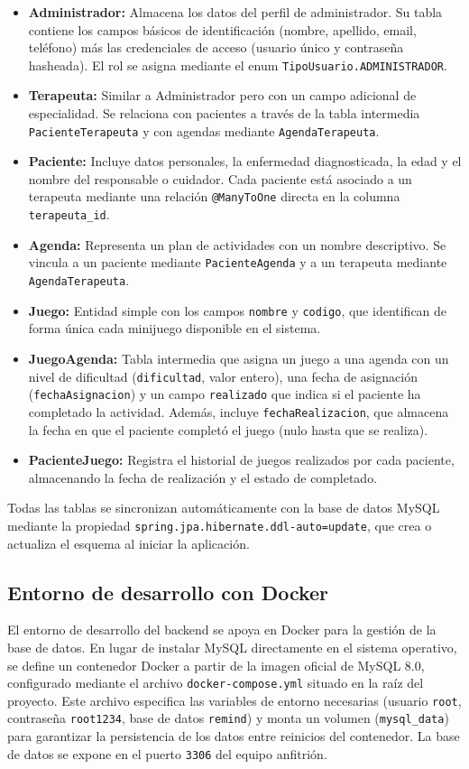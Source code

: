 \begin{itemize}
    \item \textbf{Administrador:} Almacena los datos del perfil de administrador. Su tabla contiene los campos básicos de identificación (nombre, apellido, email, teléfono) más las credenciales de acceso (usuario único y contraseña hasheada). El rol se asigna mediante el enum \texttt{TipoUsuario.ADMINISTRADOR}.
    \item \textbf{Terapeuta:} Similar a Administrador pero con un campo adicional de especialidad. Se relaciona con pacientes a través de la tabla intermedia \texttt{PacienteTerapeuta} y con agendas mediante \texttt{AgendaTerapeuta}.
    \item \textbf{Paciente:} Incluye datos personales, la enfermedad diagnosticada, la edad y el nombre del responsable o cuidador. Cada paciente está asociado a un terapeuta mediante una relación \texttt{@ManyToOne} directa en la columna \texttt{terapeuta\_id}.
    \item \textbf{Agenda:} Representa un plan de actividades con un nombre descriptivo. Se vincula a un paciente mediante \texttt{PacienteAgenda} y a un terapeuta mediante \texttt{AgendaTerapeuta}.
    \item \textbf{Juego:} Entidad simple con los campos \texttt{nombre} y \texttt{codigo}, que identifican de forma única cada minijuego disponible en el sistema.
    \item \textbf{JuegoAgenda:} Tabla intermedia que asigna un juego a una agenda con un nivel de dificultad (\texttt{dificultad}, valor entero), una fecha de asignación (\texttt{fechaAsignacion}) y un campo \texttt{realizado} que indica si el paciente ha completado la actividad. Además, incluye \texttt{fechaRealizacion}, que almacena la fecha en que el paciente completó el juego (nulo hasta que se realiza).
    \item \textbf{PacienteJuego:} Registra el historial de juegos realizados por cada paciente, almacenando la fecha de realización y el estado de completado.
\end{itemize}

Todas las tablas se sincronizan automáticamente con la base de datos MySQL mediante la propiedad \texttt{spring.jpa.hibernate.ddl-auto=update}, que crea o actualiza el esquema al iniciar la aplicación.

\subsection{Entorno de desarrollo con Docker}
El entorno de desarrollo del backend se apoya en Docker para la gestión de la base de datos. En lugar de instalar MySQL directamente en el sistema operativo, se define un contenedor Docker a partir de la imagen oficial de MySQL 8.0, configurado mediante el archivo \texttt{docker-compose.yml} situado en la raíz del proyecto. Este archivo especifica las variables de entorno necesarias (usuario \texttt{root}, contraseña \texttt{root1234}, base de datos \texttt{remind}) y monta un volumen (\texttt{mysql\_data}) para garantizar la persistencia de los datos entre reinicios del contenedor. La base de datos se expone en el puerto \texttt{3306} del equipo anfitrión.


